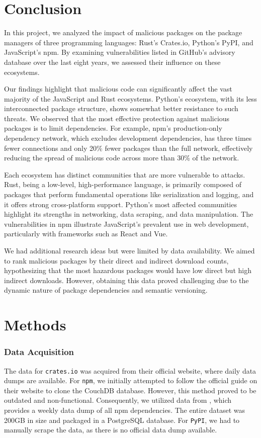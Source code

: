 \documentclass[9pt,twocolumn,twoside]{pnas-report}
\begin{document}
\section*{Conclusion}

In this project, we analyzed the impact of malicious packages on the package managers of three programming languages: Rust's Crates.io, Python's PyPI, and JavaScript's npm.
By examining vulnerabilities listed in GitHub's advisory database over the last eight years, we assessed their influence on these ecosystems.

Our findings highlight that malicious code can significantly affect the vast majority of the JavaScript and Rust ecosystems.
Python's ecosystem, with its less interconnected package structure, shows somewhat better resistance to such threats.
We observed that the most effective protection against malicious packages is to limit dependencies.
For example, npm's production-only dependency network, which excludes development dependencies, has three times fewer connections and only 20\% fewer packages than the full network, effectively reducing the spread of malicious code across more than 30\% of the network.

Each ecosystem has distinct communities that are more vulnerable to attacks.
Rust, being a low-level, high-performance language, is primarily composed of packages that perform fundamental operations like serialization and logging, and it offers strong cross-platform support.
Python's most affected communities highlight its strengths in networking, data scraping, and data manipulation.
The vulnerabilities in npm illustrate JavaScript's prevalent use in web development, particularly with frameworks such as React and Vue.

We had additional research ideas but were limited by data availability.
We aimed to rank malicious packages by their direct and indirect download counts, hypothesizing that the most hazardous packages would have low direct but high indirect downloads.
However, obtaining this data proved challenging due to the dynamic nature of package dependencies and semantic versioning.

\small

\section*{Methods}

\subsubsection*{Data Acquisition} The data for \texttt{crates.io} was acquired from their official website, where daily data dumps are available.
For \texttt{npm}, we initially attempted to follow the official guide on their website to clone the CouchDB database.
However, this method proved to be outdated and non-functional.
Consequently, we utilized data from \cite{npmdata}, which provides a weekly data dump of all npm dependencies.
The entire dataset was 200GB in size and packaged in a PostgreSQL database.
For \texttt{PyPI}, we had to manually scrape the data, as there is no official data dump available.
\end{document}
